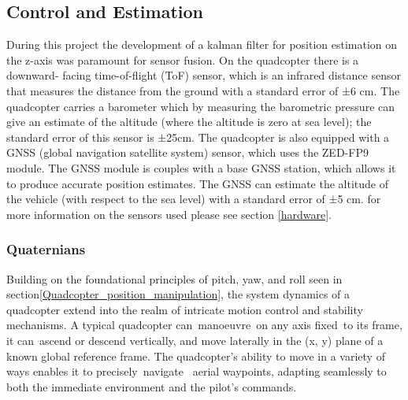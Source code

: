 \documentclass{article}
\begin{document}
\subsection{Control and Estimation}\label{control_and_estimation} During this
project the development of a kalman filter for position estimation on the z-axis
was paramount for sensor fusion. On the quadcopter there is a downward- facing
time-of-flight (ToF) sensor, which is an infrared distance sensor that measures
the distance from the ground with a standard error of ±6 cm. The quadcopter
carries a barometer which by measuring the barometric pressure can give an
estimate of the altitude (where the altitude is zero at sea level); the standard
error of this sensor is ±25cm. The quadcopter is also equipped with a GNSS
(global navigation satellite system) sensor, which uses the ZED-FP9 module. The
GNSS module is couples with a base GNSS station, which allows it to produce
accurate position estimates. The GNSS can estimate the altitude of the vehicle
(with respect to the sea level) with a standard error of ±5 cm. for more
information on the sensors used please see section \ref{hardware}.
\subsubsection{Quaternians}
Building on the foundational principles of pitch, yaw, and roll seen in
section\ref{Quadcopter_position_manipulation}, the system dynamics of a
quadcopter extend into the realm of intricate motion control and stability
mechanisms. A typical quadcopter can manoeuvre on any axis fixed to its frame,
it can ascend or descend vertically, and move laterally in the (x, y) plane of a
known global reference frame. The quadcopter's ability to move in a variety of
ways enables it to precisely navigate  aerial waypoints, adapting seamlessly to
both the immediate environment and the pilot's commands. 
\end{document}
